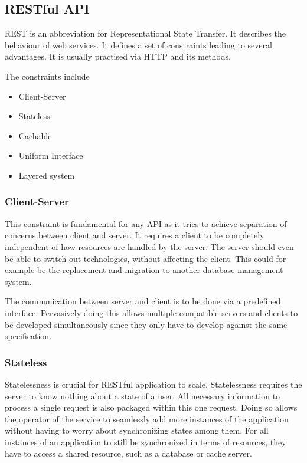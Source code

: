 \subsection{RESTful API}

REST is an abbreviation for Representational State Transfer. It describes the
behaviour of web services. It defines a set of constraints leading to several
advantages. It is usually practised via HTTP and its methods.

The constraints include

\begin{itemize}
  \item{Client-Server}
  \item{Stateless}
  \item{Cachable}
  \item{Uniform Interface}
  \item{Layered system}
\end{itemize}

\subsubsection{Client-Server}

This constraint is fundamental for any API as it tries to achieve
separation of concerns between client and server. It requires a client to be
completely independent of how resources are handled by the server. The server
should even be able to switch out technologies, without affecting the client.
This could for example be the replacement and migration to another database
management system.

The communication between server and client is to be done via a predefined
interface. Pervasively doing this allows multiple compatible servers and clients
to be developed simultaneously since they only have to develop against the same
specification.

\subsubsection{Stateless}

Statelessness is crucial for RESTful application to scale. Statelessness
requires the server to know nothing about a state of a user. All necessary
information to process a single request is also packaged within this one
request. Doing so allows the operator of the service to seamlessly add more
instances of the application without having to worry about synchronizing states
among them. For all instances of an application to still be synchronized in
terms of resources, they have to access a shared resource, such as a database
or cache server.

